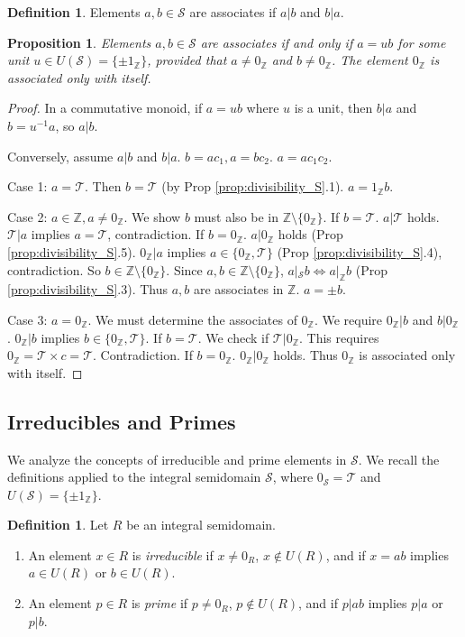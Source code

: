 \documentclass[11pt, a4paper]{article}
\theoremstyle{plain}
\newtheorem{proposition}[theorem]{Proposition}
\theoremstyle{definition}
\newtheorem{definition}[theorem]{Definition}
\numberwithin{equation}{section}
\newcommand{\Z}{\mathbb{Z}}
\newcommand{\Tobj}{\mathcal{T}} %
\newcommand{\SemiringS}{\mathcal{S}}
\begin{document}
\begin{definition}
Elements $a, b \in \SemiringS$ are associates if $a|b$ and $b|a$.
\end{definition}

\begin{proposition}\label{prop:associates_S}
Elements $a, b \in \SemiringS$ are associates if and only if $a=ub$ for some unit $u \in U(\SemiringS)=\{\pm 1_{\Z}\}$, provided that $a\neq 0_{\Z}$ and $b\neq 0_{\Z}$. The element $0_{\Z}$ is associated only with itself.
\end{proposition}
\begin{proof}
In a commutative monoid, if $a=ub$ where $u$ is a unit, then $b|a$ and $b=u^{-1}a$, so $a|b$.

Conversely, assume $a|b$ and $b|a$. $b=ac_1, a=bc_2$. $a=ac_1c_2$.

Case 1: $a=\Tobj$. Then $b=\Tobj$ (by Prop \ref{prop:divisibility_S}.1). $a=1_{\Z}b$.

Case 2: $a \in \Z, a\neq 0_{\Z}$. We show $b$ must also be in $\Z\setminus\{0_{\Z}\}$.
If $b=\Tobj$. $a|\Tobj$ holds. $\Tobj|a$ implies $a=\Tobj$, contradiction.
If $b=0_{\Z}$. $a|0_{\Z}$ holds (Prop \ref{prop:divisibility_S}.5). $0_{\Z}|a$ implies $a\in\{0_{\Z}, \Tobj\}$ (Prop \ref{prop:divisibility_S}.4), contradiction.
So $b \in \Z\setminus\{0_{\Z}\}$.
Since $a, b \in \Z\setminus\{0_{\Z}\}$, $a|_{\SemiringS} b \iff a|_{\Z} b$ (Prop \ref{prop:divisibility_S}.3). Thus $a, b$ are associates in $\Z$. $a=\pm b$.

Case 3: $a=0_{\Z}$. We must determine the associates of $0_{\Z}$. We require $0_{\Z}|b$ and $b|0_{\Z}$.
$0_{\Z}|b$ implies $b\in\{0_{\Z}, \Tobj\}$.
If $b=\Tobj$. We check if $\Tobj|0_{\Z}$. This requires $0_{\Z}=\Tobj\times c = \Tobj$. Contradiction.
If $b=0_{\Z}$. $0_{\Z}|0_{\Z}$ holds.
Thus $0_{\Z}$ is associated only with itself.
\end{proof}

\subsection{Irreducibles and Primes}

We analyze the concepts of irreducible and prime elements in $\SemiringS$. We recall the definitions applied to the integral semidomain $\SemiringS$, where $0_{\SemiringS}=\Tobj$ and $U(\SemiringS)=\{\pm 1_{\Z}\}$.

\begin{definition}
Let $R$ be an integral semidomain.
\begin{enumerate}
    \item An element $x \in R$ is \emph{irreducible} if $x\neq 0_R$, $x \notin U(R)$, and if $x=ab$ implies $a \in U(R)$ or $b \in U(R)$.
    \item An element $p \in R$ is \emph{prime} if $p\neq 0_R$, $p \notin U(R)$, and if $p|ab$ implies $p|a$ or $p|b$.
\end{enumerate}
\end{definition}
\end{document}
